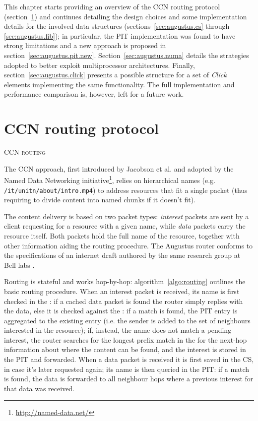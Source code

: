 \documentclass[12pt,a4paper,twoside]{book}
\newcommand{\mono}[1]{\texttt{#1}}
\begin{document}
This chapter starts providing an overview of the CCN routing protocol (section~\ref{sec:augustus.ccn}) and continues detailing the design choices and some implementation details for the involved data structures (sections~\ref{sec:augustus.cs} through \ref{sec:augustus.fib});
in particular, the \gls{PIT} implementation was found to have strong limitations and a new approach is proposed in section~\ref{sec:augustus.pit.new}.
Section~\ref{sec:augustus.numa} details the strategies adopted to better exploit multiprocessor architectures.
Finally, section~\ref{sec:augustus.click} presents a possible structure for a set of \textit{Click} elements implementing the same functionality. The full implementation and performance comparison is, however, left for a future work.

\section{CCN routing protocol}\label{sec:augustus.ccn}
\begin{algorithm}[htb]
  \DontPrintSemicolon
  \caption[CCN routing]{\textsc{CCN routing}}
  \label{algo:routing}
\end{algorithm}

The \gls{CCN} approach, first introduced by Jacobson et al. \cite{ccn} and adopted by the Named Data Networking initiative\footnote{\url{http://named-data.net/}}, relies on hierarchical names (e.g. \mono{/it/unitn/about/intro.mp4}) to address resources that fit a single packet (thus requiring to divide content into named chunks if it doesn't fit).

The content delivery is based on two packet types: \textit{interest} packets are sent by a client requesting for a resource with a given name, while \textit{data} packets carry the resource itself. Both packets hold the full name of the resource, together with other information aiding the routing procedure.
The Augustus router conforms to the specifications of an internet draft authored by the same research group at Bell labs \cite{icn-packet}.

Routing is stateful and works hop-by-hop: algorithm~\ref{algo:routing} outlines the basic routing procedure. When an interest packet is received, its name is first checked in the : if a cached data packet is found the router simply replies with the data, else it is checked against the : if a match is found, the PIT entry is aggregated to the existing entry (i.e. the sender is added to the set of neighbours interested in the resource); if, instead, the name does not match a pending interest, the router searches for the longest prefix match in the  for the next-hop information about where the content can be found, and the interest is stored in the PIT and forwarded.
When a data packet is received it is first saved in the CS, in case it's later requested again; its name is then queried in the PIT: if a match is found, the data is forwarded to all neighbour hops where a previous interest for that data was received.
\end{document}
